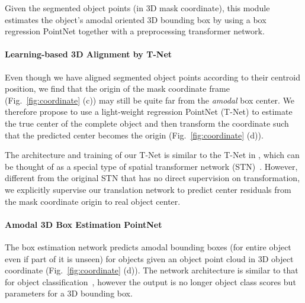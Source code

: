 Given the segmented object points (in 3D mask coordinate), this module estimates the object's amodal oriented 3D bounding box by using a box regression PointNet together with a preprocessing transformer network.

\paragraph{Learning-based 3D Alignment by T-Net} Even though we have aligned segmented object points according to their centroid position, we find that the origin of the mask coordinate frame (Fig.~\ref{fig:coordinate} (c)) may still be quite far from the \emph{amodal} box center. We therefore propose to use a light-weight regression PointNet (T-Net) to estimate the true center of the complete object and then transform the coordinate such that the predicted center becomes the origin (Fig.~\ref{fig:coordinate} (d)).

The architecture and training of our T-Net is similar to the T-Net in \cite{qi2017pointnet}, which can be thought of as a special type of spatial transformer network (STN)~\cite{jaderberg2015spatial}. However, different from the original STN that has no direct supervision on transformation, we explicitly supervise our translation network to predict center residuals from the mask coordinate origin to real object center. %

\paragraph{Amodal 3D Box Estimation PointNet}
The box estimation network predicts amodal bounding boxes (for entire object even if part of it is unseen) for objects given an object point cloud in 3D object coordinate (Fig.~\ref{fig:coordinate} (d)). The network architecture is similar to that for object classification~\cite{qi2017pointnet, qi2017pointnetplusplus}, however the output is no longer object class scores but parameters for a 3D bounding box.

